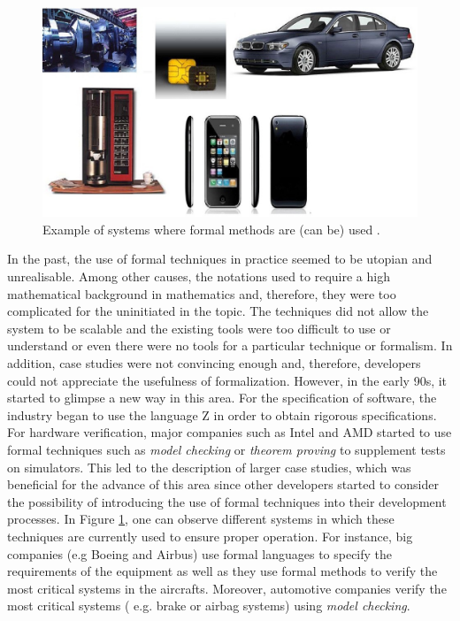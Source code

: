 \begin{figure}
\begin{center}
  \includegraphics[scale=0.5, width =\columnwidth]{Figures/usos}
\end{center}
  \caption{Example of systems where formal methods are (can be) used .}
  \label{fig:uso}
\end{figure}

In the past, the use of formal techniques in practice seemed to be utopian and unrealisable. 
Among other causes, the notations used to require a high mathematical background in
mathematics and, therefore, they were too complicated for the uninitiated in the topic. 
The techniques did not allow the system to be scalable and the existing tools were
too difficult to use or understand or even there were no tools for a particular 
technique or formalism. In addition, case studies were not convincing enough and, 
therefore, developers could not appreciate the usefulness of formalization. 
However, in the early 90s, it started to glimpse a new way in this area. 
For the specification of software, the industry began to use the language Z 
in order to obtain rigorous specifications. For hardware verification, major 
companies such as Intel and AMD started to use formal techniques such as \emph{model checking} 
or \emph{theorem proving} to supplement tests on simulators. This led to the description of larger case studies,
which was beneficial for the advance of this area since other developers started to consider the possibility of 
introducing the use of formal techniques into their development processes.
In Figure \ref{fig:uso}, one can observe different systems in which these techniques are currently
used to ensure proper operation. For instance, big companies (e.g Boeing and Airbus)
use formal languages to specify the requirements of the equipment as well as they use 
formal methods to verify the most critical systems in the aircrafts. Moreover, automotive
companies verify the most critical systems ( e.g. brake or airbag systems) using \emph{model checking}. 


